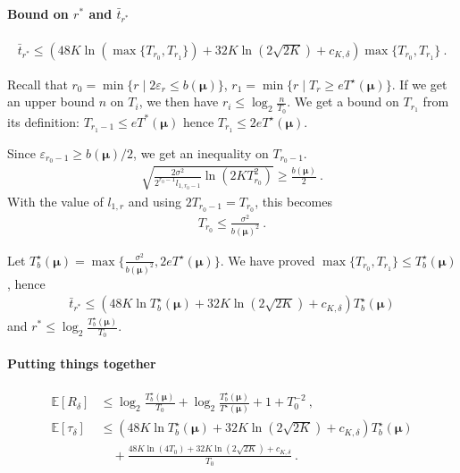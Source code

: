\paragraph{Bound on $r^*$ and $\bar{t}_{r^*}$}

\begin{align*}
\bar{t}_{r^*}
\le (48 K \ln (\max\{T_{r_0}, T_{r_1}\}) + 32 K \ln(2\sqrt{2K}) + c_{K,\delta}) \max\{T_{r_0}, T_{r_1}\}
\: .
\end{align*}


Recall that $r_0 = \min\{r \mid 2 \varepsilon_r \le b(\bm\mu)\}$, $r_1 =  \min \{r \mid T_r \ge e T^\star(\bm\mu)\}$.
If we get an upper bound $n$ on $T_i$, we then have $r_i \le \log_2 \frac{n}{T_0}$.
We get a bound on $T_{r_1}$ from its definition: $T_{r_1-1} \le e T^*(\bm\mu)$ hence $T_{r_1} \le 2 e T^\star(\bm\mu)$.

Since $\varepsilon_{r_0 - 1} \ge b(\bm\mu)/2$, we get an inequality on $T_{r_0 - 1}$.
\begin{align*}
\sqrt{\frac{2\sigma^2}{2^{r_0 - 1}l_{1, r_0-1}} \ln \left( 2K T_{r_0}^2 \right)} \ge \frac{b(\bm\mu)}{2}
\: .
\end{align*}
With the value of $l_{1,r}$ and using $2 T_{r_0 - 1} = T_{r_0}$, this becomes
\begin{align*}
T_{r_0} \le \frac{\sigma^2}{b(\bm\mu)^2}
\: .
\end{align*}

Let $T^\star_b(\bm\mu) = \max\{\frac{\sigma^2}{b(\bm\mu)^2}, 2 e T^\star(\bm\mu)\}$.
We have proved $\max\{T_{r_0}, T_{r_1}\} \le T^\star_b(\bm\mu)$, hence
\begin{align*}
\bar{t}_{r^*}
\le (48 K \ln T^\star_b(\bm\mu) + 32 K \ln(2\sqrt{2K}) + c_{K,\delta}) T^\star_b(\bm\mu)
\end{align*}
and $r^* \le \log_2 \frac{T^\star_b(\bm\mu)}{T_0}$.

\paragraph{Putting things together}

\begin{align*}
\mathbb{E}\left[R_\delta\right]
&\le \log_2 \frac{T^\star_b(\bm\mu)}{T_0} + \log_2 \frac{T^\star_b(\bm\mu)}{T^\star(\bm\mu)} + 1 + T_0^{-2}
\: , \\
\mathbb{E}\left[\tau_\delta\right]
&\le (48 K \ln T^\star_b(\bm\mu) + 32 K \ln(2\sqrt{2K}) + c_{K,\delta}) T^\star_b(\bm\mu)
\\ & \quad + \frac{48 K \ln(4T_0) + 32 K \ln(2\sqrt{2K}) + c_{K,\delta}}{T_0}
\: .
\end{align*}

